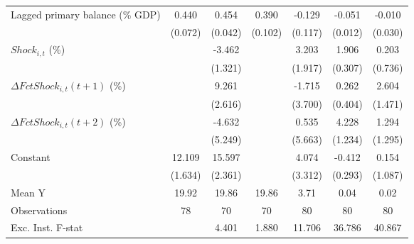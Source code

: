 {\begin{tabular}{l*{6}{c}}
\addlinespace
Lagged primary balance (\% GDP)&       0.440\sym{***}&       0.454\sym{***}&       0.390\sym{***}&      -0.129         &      -0.051\sym{***}&      -0.010         \\
                    &     (0.072)         &     (0.042)         &     (0.102)         &     (0.117)         &     (0.012)         &     (0.030)         \\
\addlinespace
$ Shock_{i,t}$ (\%) &                     &      -3.462\sym{**} &                     &       3.203         &       1.906\sym{***}&       0.203         \\
                    &                     &     (1.321)         &                     &     (1.917)         &     (0.307)         &     (0.736)         \\
\addlinespace
$ \Delta FctShock_{i,t}(t+1)$ (\%)&                     &       9.261\sym{***}&                     &      -1.715         &       0.262         &       2.604         \\
                    &                     &     (2.616)         &                     &     (3.700)         &     (0.404)         &     (1.471)         \\
\addlinespace
$ \Delta FctShock_{i,t}(t+2)$ (\%)&                     &      -4.632         &                     &       0.535         &       4.228\sym{***}&       1.294         \\
                    &                     &     (5.249)         &                     &     (5.663)         &     (1.234)         &     (1.295)         \\
\addlinespace
Constant            &      12.109\sym{***}&      15.597\sym{***}&                     &       4.074         &      -0.412         &       0.154         \\
                    &     (1.634)         &     (2.361)         &                     &     (3.312)         &     (0.293)         &     (1.087)         \\
\midrule
Mean Y              &       19.92         &       19.86         &       19.86         &        3.71         &        0.04         &        0.02         \\
Observations        &          78         &          70         &          70         &          80         &          80         &          80         \\
Exc. Inst. F-stat   &                     &       4.401         &       1.880         &      11.706         &      36.786         &      40.867         \\
\bottomrule
\end{tabular}
}
